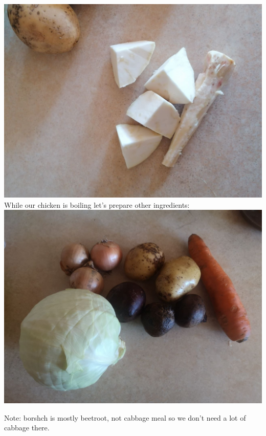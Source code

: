 \documentclass[11pt,a4paper]{article}
\begin{document}
\includegraphics[width=\textwidth]{4.jpg} \\


While our chicken is boiling let's prepare other ingredients:\\
\includegraphics[width=\textwidth]{3.jpg}

Note: borshch is mostly beetroot, not cabbage meal so we don't need a lot of cabbage there. \\
\end{document}
